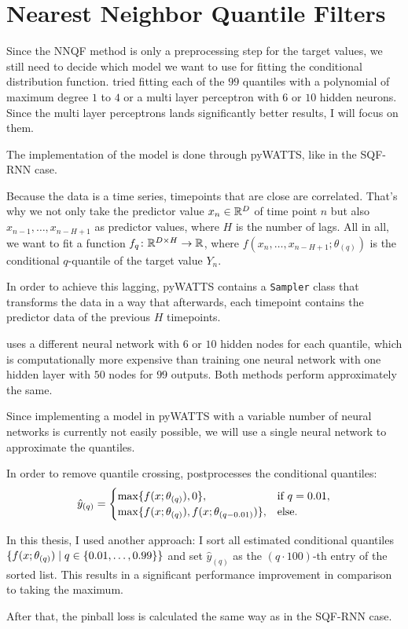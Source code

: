 \section{Nearest Neighbor Quantile Filters}
\label{sec:implementation-nnqf}

Since the NNQF method is only a preprocessing step for the target values, 
we still need to decide which model we want to use for fitting the 
conditional distribution function. 
\Textcite{Ordiano2019} tried fitting each of the \(99\) quantiles 
with a polynomial of maximum degree \(1\) to \(4\) or a multi layer perceptron 
with \(6\) or \(10\) hidden neurons. Since the multi layer perceptrons lands 
significantly better results, I will focus on them. 

The implementation of the model is done through pyWATTS, like in the SQF-RNN case.

Because the data is a time series, timepoints that are close are correlated. 
That's why we not only take the predictor value \(x_n \in \mathbb{R}^D\) of time point \(n\) 
but also \(x_{n-1}, \ldots, x_{n-H+1}\) as predictor values, where \(H\) is the number of lags.
All in all, we want to fit a function \(f_q\colon \mathbb{R}^{D\times H} \rightarrow \mathbb{R}\), 
where \( f(x_n, \ldots, x_{n-H+1}; \theta_{(q)})\) is the conditional \(q\)-quantile of the target value \(Y_n\).

In order to achieve this lagging, pyWATTS contains a \texttt{Sampler} class
that transforms the data in a way that afterwards, each timepoint contains the 
predictor data of the previous \(H\) timepoints.

\Textcite{Ordiano2019} uses a different neural network with \(6\) or \(10\) hidden nodes for each quantile, 
which is computationally more expensive than training one neural network with 
one hidden layer with \(50\) nodes for \(99\) outputs. 
Both methods perform approximately the same.  

Since implementing a model in pyWATTS with a variable number of neural networks is currently 
not easily possible, we will use a single neural network to approximate the quantiles.

In order to remove quantile crossing, \Textcite{Ordiano2019} postprocesses the conditional quantiles:
\[ \hat{y}_{(q)} = \begin{cases}
    \max\{ f(x; \theta_{(q)}), 0 \}, &\text{if } q = 0.01, \\
    \max\{ f(x; \theta_{(q)}), f(x; \theta_{(q-0.01)}) \}, &\text{else.}
\end{cases}\]

In this thesis, I used another approach: 
I sort all estimated conditional quantiles \(\{ f(x; \theta_{(q)}) \;|\; q\in \{0.01, \ldots, 0.99\} \}\) 
and set \(\hat{y}_{(q)}\) as the \((q\cdot 100)\)-th entry of the sorted list. This results in a significant performance improvement 
in comparison to taking the maximum. 

After that, the pinball loss is calculated the same way as in the SQF-RNN case.
